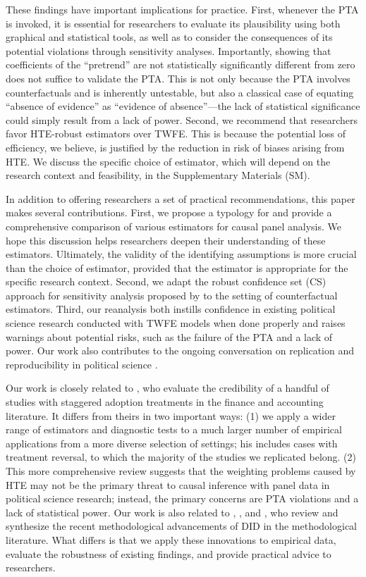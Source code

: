 \documentclass[12pt]{article}
\begin{document}
These findings have important implications for practice. First, whenever the PTA is invoked, it is essential for researchers to evaluate its plausibility using both graphical and statistical tools, as well as to consider the consequences of its potential violations through sensitivity analyses. Importantly, showing that coefficients of the ``pretrend'' are not statistically significantly different from zero does not suffice to validate the PTA. This is not only because the PTA involves counterfactuals and is inherently untestable, but also a classical case of equating ``absence of evidence'' as ``evidence of absence''---the lack of statistical significance could simply result from a lack of power. Second, we recommend that researchers favor HTE-robust estimators over TWFE. This is because the potential loss of efficiency, we believe, is justified by the reduction in risk of biases arising from HTE. We discuss the specific choice of estimator, which will depend on the research context and feasibility, in the Supplementary Materials (SM). 

In addition to offering researchers a set of practical recommendations, this paper makes several contributions. First, we propose a typology for and provide a comprehensive comparison of various estimators for causal panel analysis. We hope this discussion helps researchers deepen their understanding of these estimators. Ultimately, the validity of the identifying assumptions is more crucial than the choice of estimator, provided that the estimator is appropriate for the specific research context. Second, we adapt the robust confidence set (CS) approach for sensitivity analysis proposed by \citet{rambachan2023more} to the setting of counterfactual estimators. Third, our reanalysis both instills confidence in existing political science research conducted with TWFE models when done properly and raises warnings about potential risks, such as the failure of the PTA and a lack of power. Our work also contributes to the ongoing conversation on replication and reproducibility in political science \citep[e.g.,][]{eggers2015validity, lall2016multiple, hainmueller2019much,lal2021much}.


Our work is closely related to \citet{BLW2022}, who evaluate the credibility of a handful of studies with staggered adoption treatments in the finance and accounting literature. It differs from theirs in two important ways: (1) we apply a wider range of estimators and diagnostic tests to a much larger number of empirical applications from a more diverse selection of settings; his includes cases with treatment reversal, to which the majority of the studies we replicated belong. (2) This more comprehensive review suggests that the weighting problems caused by HTE may not be the primary threat to causal inference with panel data in political science research; instead, the primary concerns are PTA violations and a lack of statistical power. Our work is also related to \citet{roth2023s}, \citet{Xu2023}, and \citet{Arkhangelsky2023-zy}, who review and synthesize the recent methodological advancements of DID in the methodological literature. What differs is that we apply these innovations to empirical data, evaluate the robustness of existing findings, and provide practical advice to researchers. 
\end{document}
